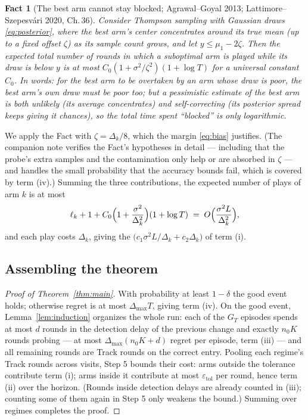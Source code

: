 \documentclass[11pt]{article}
\newtheorem{fact}{Fact}
\newcommand{\etol}{\varepsilon_{\mathrm{tol}}}
\begin{document}
\begin{fact}[The best arm cannot stay blocked; \textnormal{Agrawal--Goyal 2013; Lattimore--Szepesv\'ari 2020, Ch.\,36}]
\label{fact:blocked}
Consider Thompson sampling with Gaussian draws \eqref{eq:posterior}, where the best arm's center concentrates around its true mean (up to a fixed offset $\zeta$) as its sample count grows, and let $y\le\mu_1-2\zeta$. Then the expected total number of rounds in which a suboptimal arm is played while its draw is below $y$ is at most $C_0(1+\sigma^2/\zeta^2)(1+\log T)$ for a universal constant $C_0$.
\emph{In words: for the best arm to be overtaken by an arm whose draw is poor, the best arm's own draw must be poor too; but a pessimistic estimate of the best arm is both unlikely (its average concentrates) and self-correcting (its posterior spread keeps giving it chances), so the total time spent ``blocked'' is only logarithmic.}
\end{fact}

We apply the Fact with $\zeta=\Delta_k/8$, which the margin \eqref{eq:bias} justifies. (The companion note verifies the Fact's hypotheses in detail --- including that the probe's extra samples and the contamination only help or are absorbed in $\zeta$ --- and handles the small probability that the accuracy bounds fail, which is covered by term (iv).) Summing the three contributions, the expected number of plays of arm $k$ is at most
\[
\ell_k+1+C_0\Bigl(1+\frac{\sigma^2}{\Delta_k^2}\Bigr)(1+\log T)
\;=\;O\Bigl(\frac{\sigma^2L}{\Delta_k^2}\Bigr),
\]
and each play costs $\Delta_k$, giving the $\bigl(c_1\sigma^2L/\Delta_k+c_2\Delta_k\bigr)$ of term (i).

\subsection{Assembling the theorem}

\begin{proof}[Proof of Theorem~\ref{thm:main}]
With probability at least $1-\delta$ the good event holds; otherwise regret is at most $\Delta_{\max}T$, giving term (iv). On the good event, Lemma~\ref{lem:induction} organizes the whole run: each of the $G_T$ episodes spends at most $d$ rounds in the detection delay of the previous change and exactly $n_0K$ rounds probing --- at most $\Delta_{\max}(n_0K+d)$ regret per episode, term (iii) --- and all remaining rounds are Track rounds on the correct entry. Pooling each regime's Track rounds across visits, Step 5 bounds their cost: arms outside the tolerance contribute term (i); arms inside it contribute at most $\etol$ per round, hence term (ii) over the horizon. (Rounds inside detection delays are already counted in (iii); counting some of them again in Step 5 only weakens the bound.) Summing over regimes completes the proof.
\end{proof}
\end{document}
